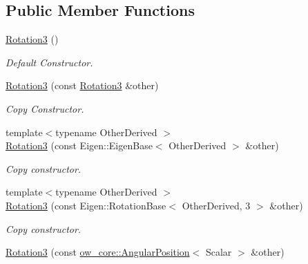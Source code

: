 \subsection*{Public Member Functions}
\begin{DoxyCompactItemize}
\item 
\hyperlink{classow__core_1_1Rotation3_abd12cb236cf8ff6e5337228633d4815b}{Rotation3} ()\hypertarget{classow__core_1_1Rotation3_abd12cb236cf8ff6e5337228633d4815b}{}\label{classow__core_1_1Rotation3_abd12cb236cf8ff6e5337228633d4815b}

\begin{DoxyCompactList}\small\item\em Default Constructor. \end{DoxyCompactList}\item 
\hyperlink{classow__core_1_1Rotation3_a485da1e01bc010d26169e0d9e4f95854}{Rotation3} (const \hyperlink{classow__core_1_1Rotation3}{Rotation3} \&other)\hypertarget{classow__core_1_1Rotation3_a485da1e01bc010d26169e0d9e4f95854}{}\label{classow__core_1_1Rotation3_a485da1e01bc010d26169e0d9e4f95854}

\begin{DoxyCompactList}\small\item\em Copy Constructor. \end{DoxyCompactList}\item 
{\footnotesize template$<$typename Other\+Derived $>$ }\\\hyperlink{classow__core_1_1Rotation3_af8f7c2fd09be7d4e7be68c6786114fab}{Rotation3} (const Eigen\+::\+Eigen\+Base$<$ Other\+Derived $>$ \&other)
\begin{DoxyCompactList}\small\item\em Copy constructor. \end{DoxyCompactList}\item 
{\footnotesize template$<$typename Other\+Derived $>$ }\\\hyperlink{classow__core_1_1Rotation3_a34cd49f675144ebc5c6cd50adbd18319}{Rotation3} (const Eigen\+::\+Rotation\+Base$<$ Other\+Derived, 3 $>$ \&other)
\begin{DoxyCompactList}\small\item\em Copy constructor. \end{DoxyCompactList}\item 
\hyperlink{classow__core_1_1Rotation3_a7e0848b9b7ba790b46a812c5f3a5d15b}{Rotation3} (const \hyperlink{classow__core_1_1AngularPosition}{ow\+\_\+core\+::\+Angular\+Position}$<$ Scalar $>$ \&other)\hypertarget{classow__core_1_1Rotation3_a7e0848b9b7ba790b46a812c5f3a5d15b}{}\label{classow__core_1_1Rotation3_a7e0848b9b7ba790b46a812c5f3a5d15b}


\end{DoxyCompactItemize}
